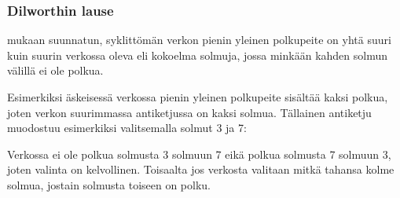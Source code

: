 \begin{center}
\begin{tikzpicture}[scale=0.9]

\end{tikzpicture}
\end{center}


\subsubsection{Dilworthin lause}


 mukaan suunnatun, syklittömän
verkon pienin yleinen polkupeite
on yhtä suuri kuin suurin verkossa oleva 
eli kokoelma solmuja,
jossa minkään kahden solmun välillä ei ole polkua.

Esimerkiksi äskeisessä verkossa pienin
yleinen polkupeite sisältää kaksi polkua,
joten verkon suurimmassa antiketjussa on kaksi solmua.
Tällainen antiketju muodostuu esimerkiksi
valitsemalla solmut 3 ja 7:

\begin{center}
\end{center}

Verkossa ei ole polkua solmusta 3 solmuun 7
eikä polkua solmusta 7 solmuun 3,
joten valinta on kelvollinen.
Toisaalta jos verkosta valitaan mitkä tahansa
kolme solmua, jostain solmusta toiseen on polku.


